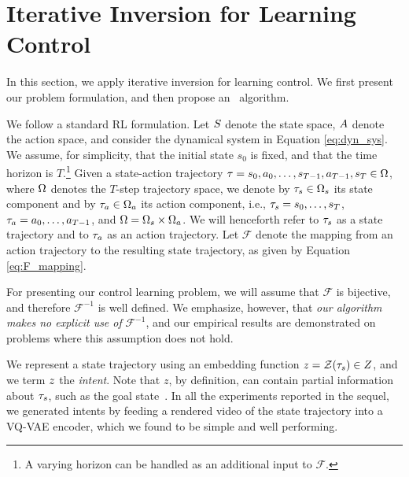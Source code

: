 \documentclass[nohyperref]{article}
\begin{document}
\section{Iterative Inversion for Learning Control}

In this section, we apply iterative inversion for learning control. We first present our problem formulation, and then propose an \methodname\ algorithm.

We follow a standard RL formulation. Let $S$ denote the state space,  $A$ denote the action space, and consider the dynamical system in Equation \ref{eq:dyn_sys}. We assume, for simplicity, that the initial state $s_0$ is fixed, and that the time horizon is $T$.\footnote{A varying horizon can be handled as an additional input to $\mathcal{F}$.}
Given a state-action trajectory $\tau = s_0,a_0,\dots,s_{T-1},a_{T-1},s_T\in\Omega$, where $\Omega$ denotes the $T$-step trajectory space, we denote by $\tau_{s} \in \Omega_s$ its state component and by $\tau_{a} \in \Omega_a$ its action component, i.e., $\tau_{s} = s_0,\dots,s_T$, $\tau_{a} = a_0,\dots,a_{T-1}$, and $\Omega = \Omega_s \times \Omega_a$.  We will henceforth refer to $\tau_{s}$ as a state trajectory and to $\tau_{a}$ as an action trajectory. Let $\mathcal{F}$ denote the mapping from an action trajectory to the resulting state trajectory, as given by Equation \eqref{eq:F_mapping}. 

For presenting our control learning problem, we will assume that $\mathcal{F}$ is bijective, and therefore $\mathcal{F}^{-1}$ is well defined. We emphasize, however, that \textit{our algorithm makes no explicit use of} $\mathcal{F}^{-1}$, and our empirical results are demonstrated on problems where this assumption does not hold.

We represent a state trajectory using an embedding function $z = \mathcal{Z}(\tau_{s}) \in Z$, and we term $z$ the \textit{intent}. Note that $z$, by definition, can contain partial information about $\tau_{s}$, such as the goal state~\citep{ghosh2019learning}. In all the experiments reported in the sequel, we generated intents by feeding a rendered video of the state trajectory into a VQ-VAE encoder, which we found to be simple and well performing. 
\end{document}
